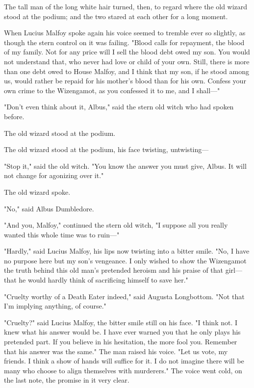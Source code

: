 The tall man of the long white hair turned, then, to regard where the old 
wizard stood at the podium; and the two stared at each other for a long moment.

When Lucius Malfoy spoke again his voice seemed to tremble ever so slightly, as 
though the stern control on it was failing. "Blood calls for repayment, the 
blood of my family. Not for any price will I sell the blood debt owed my son. 
You would not understand that, who never had love or child of your own. Still, 
there is more than one debt owed to House Malfoy, and I think that my son, if 
he stood among us, would rather be repaid for his mother's blood than for his 
own. Confess your own crime to the Wizengamot, as you confessed it to me, and I 
shall---"

"Don't even think about it, Albus," said the stern old witch who had spoken 
before.

The old wizard stood at the podium.

The old wizard stood at the podium, his face twisting, untwisting---

"Stop it," said the old witch. "You know the answer you must give, Albus. It 
will not change for agonizing over it."

The old wizard spoke.

"No," said Albus Dumbledore.

"And you, Malfoy," continued the stern old witch, "I suppose all you really 
wanted this whole time was to ruin---"

"Hardly," said Lucius Malfoy, his lips now twisting into a bitter smile. "No, I 
have no purpose here but my son's vengeance. I only wished to show the 
Wizengamot the truth behind this old man's pretended heroism and his praise of 
that girl---that he would hardly think of sacrificing himself to save her."

"Cruelty worthy of a Death Eater indeed," said Augusta Longbottom. "Not that 
I'm implying anything, of course."

"Cruelty?" said Lucius Malfoy, the bitter smile still on his face. "I think 
not. I knew what his answer would be. I have ever warned you that he only plays 
his pretended part. If you believe in his hesitation, the more fool you. 
Remember that his answer was the same." The man raised his voice. "Let us vote, 
my friends. I think a show of hands will suffice for it. I do not imagine there 
will be many who choose to align themselves with murderers." The voice went 
cold, on the last note, the promise in it very clear.

